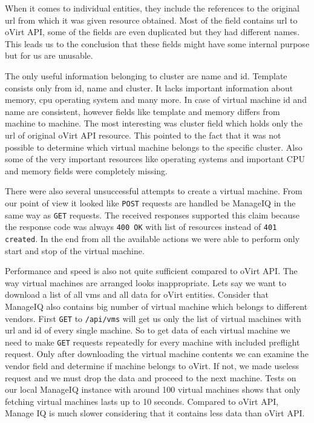 When it comes to individual entities, they include the references to the original url from which it was given resource obtained. Most of the field contains url to oVirt API, some of the fields are even duplicated but they had different names. This leads us to the conclusion that these fields might have some internal purpose but for us are unusable. 

The only useful information belonging to cluster are name and id. Template consists only from id, name and cluster. It lacks important information about memory, cpu operating system and many more. In case of virtual machine id and name are consistent, however fields like template and memory differs from machine to machine. The most interesting was cluster field which holds only the url of original oVirt API resource. This pointed to the fact that it was not possible to determine which virtual machine belongs to the specific cluster. Also some of the very important resources like operating systems and important CPU and memory fields were completely missing.

There were also several unsuccessful attempts to create a virtual machine. From our point of view it looked like \texttt{POST} requests are handled be ManageIQ in the same way as \texttt{GET} requests. The received responses supported this	claim because the response code was always \texttt{400 OK} with list of resources instead of \texttt{401 created}. In the end from all the available actions we were able to perform only start and stop of the virtual machine.

Performance and speed is also not quite sufficient compared to oVirt API. The way virtual machines are arranged looks inappropriate. Lets say we want to download a list of all vms and all data for oVirt entities. Consider that ManageIQ also contains big number of virtual machine which belongs to different vendors. First \texttt{GET} to \texttt{/api/vms} will get us only the list of virtual machines with url and id of every single machine. So to get data of each virtual machine we need to make \texttt{GET} requests repeatedly for every machine with included preflight request. Only after downloading the virtual machine contents we can examine the vendor field and determine if machine belongs to oVirt. If not, we made useless request and we must drop the data and proceed to the next machine. Tests on our local ManageIQ instance with around 100 virtual machines shows that only fetching virtual machines lasts up to 10 seconds. Compared to oVirt API, Manage IQ is much slower considering that it contains less data than oVirt API.  

